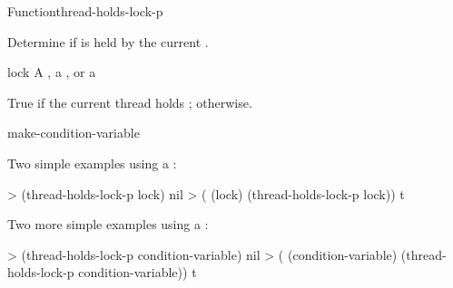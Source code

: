 \documentclass[10pt,twoside,english,pdftex]{article}
\begin{document}
\begin{functiondoc}{Function}{thread-holds-lock-p}{
    \returns{} }
%

\fnsyntax

\fnpurpose Determine if  is held by the current .

\fnpackage {}

\fnmodule {}

\fnargs
\begin{args}{lock}
\arg[lock] A , a , or a 
\end{args}

\fnreturns True if the current thread holds ; \nil{} otherwise.

\begin{alsos}{make-condition-variable}
\end{alsos}

%
\fnexamples
Two simple examples using a :
\begin{example}
> (thread-holds-lock-p lock)
nil
> ( (lock)
    (thread-holds-lock-p lock))
t
\end{example}

Two more simple examples using a :
\begin{example}
> (thread-holds-lock-p condition-variable)
nil
> ( (condition-variable)
    (thread-holds-lock-p condition-variable))
t
\end{example}

\end{functiondoc}

\end{document}
